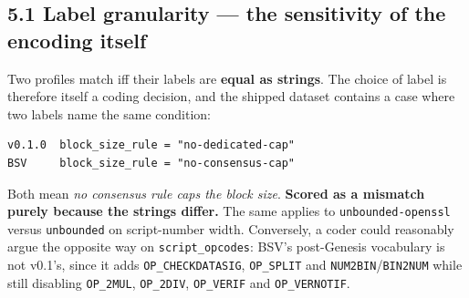 \documentclass[
]{article}
\begin{document}
\subsection{5.1 Label granularity --- the sensitivity of the encoding
itself}\label{label-granularity-the-sensitivity-of-the-encoding-itself}

Two profiles match iff their labels are \textbf{equal as strings}. The
choice of label is therefore itself a coding decision, and the shipped
dataset contains a case where two labels name the same condition:

\begin{verbatim}
v0.1.0  block_size_rule = "no-dedicated-cap"
BSV     block_size_rule = "no-consensus-cap"
\end{verbatim}

Both mean \emph{no consensus rule caps the block size}. \textbf{Scored
as a mismatch purely because the strings differ.} The same applies to
\texttt{unbounded-openssl} versus \texttt{unbounded} on script-number
width. Conversely, a coder could reasonably argue the opposite way on
\texttt{script\_opcodes}: BSV's post-Genesis vocabulary is not v0.1's,
since it adds \texttt{OP\_CHECKDATASIG}, \texttt{OP\_SPLIT} and
\texttt{NUM2BIN}/\texttt{BIN2NUM} while still disabling
\texttt{OP\_2MUL}, \texttt{OP\_2DIV}, \texttt{OP\_VERIF} and
\texttt{OP\_VERNOTIF}.
\end{document}

